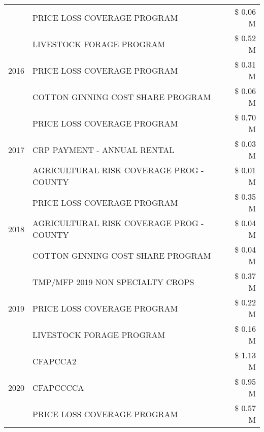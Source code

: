 \begin{tabular}{llr}
 & PRICE LOSS COVERAGE PROGRAM & \$ 0.06 M \\
\cline{1-3}
\multirow[t]{3}{*}{2016} & LIVESTOCK FORAGE PROGRAM & \$ 0.52 M \\
 & PRICE LOSS COVERAGE PROGRAM & \$ 0.31 M \\
 & COTTON GINNING COST SHARE PROGRAM & \$ 0.06 M \\
\cline{1-3}
\multirow[t]{3}{*}{2017} & PRICE LOSS COVERAGE PROGRAM & \$ 0.70 M \\
 & CRP PAYMENT - ANNUAL RENTAL & \$ 0.03 M \\
 & AGRICULTURAL RISK COVERAGE PROG - COUNTY & \$ 0.01 M \\
\cline{1-3}
\multirow[t]{3}{*}{2018} & PRICE LOSS COVERAGE PROGRAM & \$ 0.35 M \\
 & AGRICULTURAL RISK COVERAGE PROG - COUNTY & \$ 0.04 M \\
 & COTTON GINNING COST SHARE PROGRAM & \$ 0.04 M \\
\cline{1-3}
\multirow[t]{3}{*}{2019} & TMP/MFP 2019 NON SPECIALTY CROPS & \$ 0.37 M \\
 & PRICE LOSS COVERAGE PROGRAM & \$ 0.22 M \\
 & LIVESTOCK FORAGE PROGRAM & \$ 0.16 M \\
\cline{1-3}
\multirow[t]{3}{*}{2020} & CFAPCCA2 & \$ 1.13 M \\
 & CFAPCCCCA & \$ 0.95 M \\
 & PRICE LOSS COVERAGE PROGRAM & \$ 0.57 M \\
\cline{1-3}
\bottomrule
\end{tabular}
